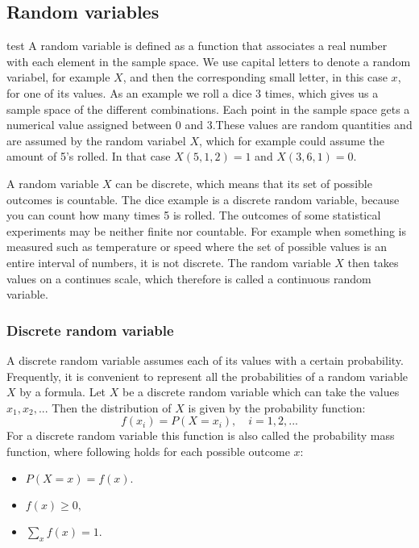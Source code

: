 
	\subsection{Random variables}
	test
	A random variable is defined as a function that associates a real number with each element in the sample space. We use capital letters to denote a random variabel, for example $X$, and then the corresponding small letter, in this case $x$, for one of its values. As an example we roll a dice 3 times, which gives us a sample space of the different combinations. Each point in the sample space gets a numerical value assigned between 0 and 3.These values are random quantities and are assumed by the random variabel $X$, which for example could assume the amount of 5's rolled. In that case $X(5,1,2) = 1$ and $X(3,6,1) = 0$.
	\newline
	
	 A random variable $X$ can be discrete, which means that its set of possible outcomes is countable. The dice example is a discrete random variable, because you can count how many times 5 is rolled. The outcomes of some statistical experiments may be neither finite nor countable. For example when something is measured such as temperature or speed where the set of possible values is an entire interval of numbers, it is not discrete. The random variable $X$ then takes values on a continues scale, which therefore is called a continuous random variable.
	
	\subsubsection{Discrete random variable}
	A discrete random variable assumes each of its values with a certain probability. Frequently, it is convenient to represent all the probabilities of a random variable $X$ by a formula. Let $X$ be a discrete random variable which can take the values $x_{1}, x_{2},...$ Then the distribution of $X$ is given by the probability function:
	$$f(x_{i})=P(X=x_{i}),\quad i=1,2,...$$
	\newline
	For a discrete random variable this function is also called the probability mass function, where following holds for each possible outcome $x$:
	
	\begin{itemize}
		\item $P(X = x) = f(x).$
		\item $f(x) \geq 0,$
		\item $\sum_x f(x) = 1.$
	\end{itemize}
	
